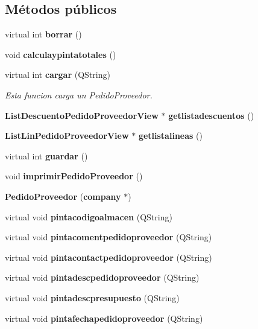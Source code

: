 \subsection*{M\'{e}todos p\'{u}blicos}
\begin{CompactItemize}
\item 
virtual int {\bf borrar} ()\label{classPedidoProveedor_a0}

\item 
void {\bf calculaypintatotales} ()
\item 
virtual int {\bf cargar} (QString)\label{classPedidoProveedor_a2}

\begin{CompactList}\small\item\em Esta funcion carga un Pedido\-Proveedor. \item\end{CompactList}\item 
{\bf List\-Descuento\-Pedido\-Proveedor\-View} $\ast$ {\bf getlistadescuentos} ()\label{classPedidoProveedor_a3}

\item 
{\bf List\-Lin\-Pedido\-Proveedor\-View} $\ast$ {\bf getlistalineas} ()\label{classPedidoProveedor_a4}

\item 
virtual int {\bf guardar} ()\label{classPedidoProveedor_a5}

\item 
void {\bf imprimir\-Pedido\-Proveedor} ()
\item 
{\bf Pedido\-Proveedor} ({\bf company} $\ast$)\label{classPedidoProveedor_a7}

\item 
virtual void {\bf pintacodigoalmacen} (QString)\label{classPedidoProveedor_a8}

\item 
virtual void {\bf pintacomentpedidoproveedor} (QString)\label{classPedidoProveedor_a9}

\item 
virtual void {\bf pintacontactpedidoproveedor} (QString)\label{classPedidoProveedor_a10}

\item 
virtual void {\bf pintadescpedidoproveedor} (QString)\label{classPedidoProveedor_a11}

\item 
virtual void {\bf pintadescpresupuesto} (QString)\label{classPedidoProveedor_a12}

\item 
virtual void {\bf pintafechapedidoproveedor} (QString)\label{classPedidoProveedor_a13}


\end{CompactItemize}
